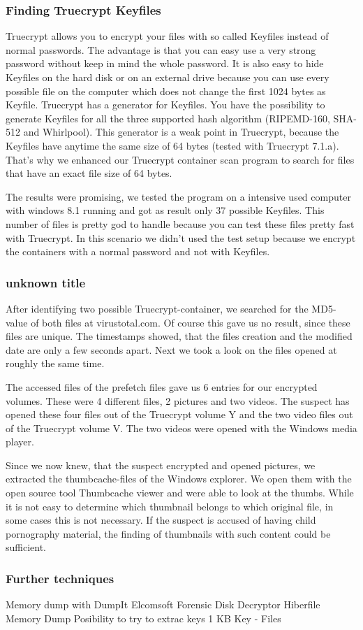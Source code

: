 \subsubsection{Finding Truecrypt Keyfiles}
Truecrypt allows you to encrypt your files with so called Keyfiles instead of normal passwords. The advantage is that you can easy use a very strong password without keep in mind the whole password. It is also easy to hide Keyfiles on the hard disk or on an external drive because you can use every possible file on the computer which does not change the first 1024 bytes as Keyfile. Truecrypt has a generator for Keyfiles. You have the possibility to generate Keyfiles for all the three supported hash algorithm (RIPEMD-160, SHA-512 and Whirlpool). This generator is a weak point in Truecrypt, because the Keyfiles have anytime the same size of 64 bytes (tested with Truecrypt 7.1.a). That's why we enhanced our Truecrypt container scan program to search for files that have an exact file size of 64 bytes.

The results were promising, we tested the program on a intensive used computer with windows 8.1 running and got as result only 37 possible Keyfiles. This number of files is pretty god to handle because you can test these files pretty fast with Truecrypt. In this scenario we didn't used the test setup because we encrypt the containers with a normal password and not with Keyfiles.
\subsubsection{unknown title}
After identifying two possible Truecrypt-container, we searched for the MD5-value of both files at virustotal.com. Of course this gave us no result, since these files are unique. The timestamps showed, that the files creation and the modified date are only a few seconds apart. Next we took a look on the files opened at roughly the same time. 

The accessed files of the prefetch files gave us 6 entries for our encrypted volumes. These were 4 different files, 2 pictures and two videos.
The suspect has opened these four files out of the Truecrypt volume Y and the two video files out of the Truecrypt volume V. The two videos were opened with the Windows media player.

Since we now knew, that the suspect encrypted and opened pictures, we extracted the thumbcache-files of the Windows explorer. We open them with the open source tool Thumbcache viewer and were able to look at the thumbs. While it is not easy to determine which thumbnail belongs to which original file, in some cases this is not necessary. If the suspect is accused of having child pornography material, the finding of thumbnails with such content could be sufficient.

\subsubsection{Further techniques}
Memory dump with DumpIt
Elcomsoft Forensic Disk Decryptor
Hiberfile
Memory Dump 
Posibility to try to extrac keys 
1 KB Key - Files


